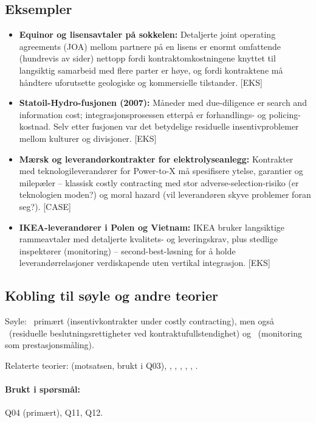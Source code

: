 \subsection*{Eksempler}
\begin{itemize}
\item \textbf{Equinor og lisensavtaler på sokkelen:} Detaljerte joint operating agreements (JOA) mellom partnere på en lisens er enormt omfattende (hundrevis av sider) nettopp fordi kontraktomkostningene knyttet til langsiktig samarbeid med flere parter er høye, og fordi kontraktene må håndtere uforutsette geologiske og kommersielle tilstander. [EKS]
\item \textbf{Statoil-Hydro-fusjonen (2007):} Måneder med due-diligence er search and information cost; integrasjonsprosessen etterpå er forhandlings- og policing-kostnad. Selv etter fusjonen var det betydelige residuelle insentivproblemer mellom kulturer og divisjoner. [EKS]
\item \textbf{Mærsk og leverandørkontrakter for elektrolyseanlegg:} Kontrakter med teknologileverandører for Power-to-X må spesifisere ytelse, garantier og milepæler -- klassisk costly contracting med stor adverse-selection-risiko (er teknologien moden?) og moral hazard (vil leverandøren skyve problemer foran seg?). [CASE]
\item \textbf{IKEA-leverandører i Polen og Vietnam:} IKEA bruker langsiktige rammeavtaler med detaljerte kvalitets- og leveringskrav, plus stedlige inspektører (monitoring) -- second-best-løsning for å holde leverandørrelasjoner verdiskapende uten vertikal integrasjon. [EKS]
\end{itemize}

\subsection*{Kobling til søyle og andre teorier}
Søyle: \SThree\ primært (insentivkontrakter under costly contracting), men også \SOne\ (residuelle beslutningsrettigheter ved kontraktufullstendighet) og \STwo\ (monitoring som prestasjonsmåling).

Relaterte teorier:  (motsatsen, brukt i Q03), , , , , , .

\paragraph{Brukt i spørsmål:} Q04 (primært), Q11, Q12.
